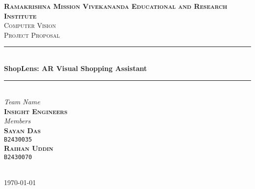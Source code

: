\begin{titlepage}
	\newcommand{\HRule}{\rule{\linewidth}{0.5mm}}
	\center


	\textsc{\LARGE \textbf{Ramakrishna Mission Vivekananda Educational and Research Institute}}\\[1.5cm]

	\textsc{\LARGE Computer Vision}\\[0.5cm]

	\textsc{\large Project Proposal}\\[0.5cm]

	\HRule\\[0.4cm]

	{\huge\bfseries ShopLens: AR Visual Shopping Assistant}\\[0.4cm]

	\HRule\\[1.5cm]



\large
\textit{Team Name}\\
\textsc{\huge\textbf{Insight Engineers}}\\
\vspace{1.5em}
\textit{Members}\\
\vspace{-0.5em}
\textsc{\textbf{Sayan Das }}\\
\vspace{-0.5em}
\textsc{\texttt{B2430035 }}\\
\textsc{\textbf{Raihan Uddin }}\\
\vspace{-0.5em}
\textsc{\texttt{B2430070} }\\

	~
	\begin{minipage}{0.4\textwidth}
	\end{minipage}


	\vfill\vfill\vfill

	{\large \today}

	\vfill

\end{titlepage}